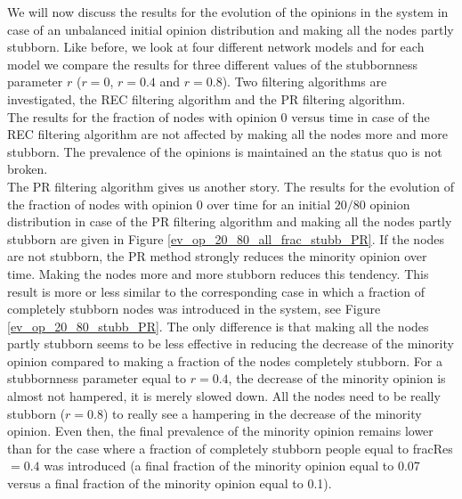 \documentclass[11 pt , letterpaper , twoside , openright]{book}
\begin{document}
We will now discuss the results for the evolution of the opinions in the system in case of an unbalanced initial opinion distribution and making all the nodes partly stubborn. Like before, we look at four different network models and for each model we compare the results for three different values of the stubbornness parameter $r$ ($r=0$, $r=0.4$ and $r=0.8$). Two filtering algorithms are investigated, the REC filtering algorithm and the PR filtering algorithm.\\
The results for the fraction of nodes with opinion 0 versus time in case of the REC filtering algorithm are not affected by making all the nodes more and more stubborn. The prevalence of the opinions is maintained an the status quo is not broken.\\
The PR filtering algorithm gives us another story. The results for the evolution of the fraction of nodes with opinion 0 over time for an initial $20/80$ opinion distribution in case of the PR filtering algorithm and making all the nodes partly stubborn are given in Figure \ref{ev_op_20_80_all_frac_stubb_PR}. If the nodes are not stubborn, the PR method strongly reduces the minority opinion over time. Making the nodes more and more stubborn reduces this tendency. This result is more or less similar to the corresponding case in which a fraction of completely stubborn nodes was introduced in the system, see Figure \ref{ev_op_20_80_stubb_PR}. The only difference is that making all the nodes partly stubborn seems to be less effective in reducing the decrease of the minority opinion compared to making a fraction of the nodes completely stubborn. For a stubbornness parameter equal to $r=0.4$, the decrease of the minority opinion is almost not hampered, it is merely slowed down. All the nodes need to be really stubborn ($r=0.8$) to really see a hampering in the decrease of the minority opinion. Even then, the final prevalence of the minority opinion remains lower than for the case where a fraction of completely stubborn people equal to fracRes $=0.4$ was introduced (a final fraction  of the minority opinion equal to 0.07 versus a final fraction of the minority opinion equal to 0.1).
\end{document}
